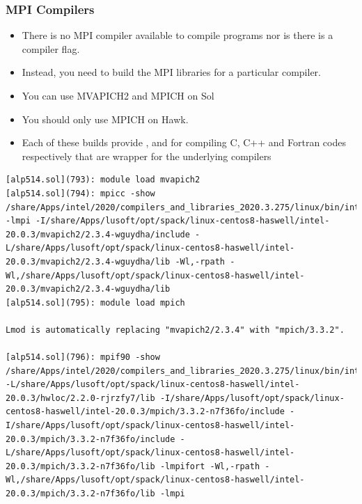 \documentclass[9pt,c]{beamer}
\begin{document}
\begin{frame}[fragile]
  \frametitle{MPI Compilers}
  \begin{itemize}
    \item There is no MPI compiler available to compile programs nor is there is a compiler flag.
    \item Instead, you need to build the MPI libraries for a particular compiler.
    \item You can use MVAPICH2 and MPICH on Sol
    \item You should only use MPICH on Hawk. 
    \item Each of these builds provide ,  and  for compiling C, C++ and Fortran codes respectively that are wrapper for the underlying compilers
  \end{itemize}
  \vspace{-0.25cm}
  \begin{block}{}
    \begin{lstlisting}[basicstyle=\tiny\ttfamily]
[alp514.sol](793): module load mvapich2
[alp514.sol](794): mpicc -show
/share/Apps/intel/2020/compilers_and_libraries_2020.3.275/linux/bin/intel64/icc -lmpi -I/share/Apps/lusoft/opt/spack/linux-centos8-haswell/intel-20.0.3/mvapich2/2.3.4-wguydha/include -L/share/Apps/lusoft/opt/spack/linux-centos8-haswell/intel-20.0.3/mvapich2/2.3.4-wguydha/lib -Wl,-rpath -Wl,/share/Apps/lusoft/opt/spack/linux-centos8-haswell/intel-20.0.3/mvapich2/2.3.4-wguydha/lib
[alp514.sol](795): module load mpich

Lmod is automatically replacing "mvapich2/2.3.4" with "mpich/3.3.2".

[alp514.sol](796): mpif90 -show
/share/Apps/intel/2020/compilers_and_libraries_2020.3.275/linux/bin/intel64/ifort -L/share/Apps/lusoft/opt/spack/linux-centos8-haswell/intel-20.0.3/hwloc/2.2.0-rjrzfy7/lib -I/share/Apps/lusoft/opt/spack/linux-centos8-haswell/intel-20.0.3/mpich/3.3.2-n7f36fo/include -I/share/Apps/lusoft/opt/spack/linux-centos8-haswell/intel-20.0.3/mpich/3.3.2-n7f36fo/include -L/share/Apps/lusoft/opt/spack/linux-centos8-haswell/intel-20.0.3/mpich/3.3.2-n7f36fo/lib -lmpifort -Wl,-rpath -Wl,/share/Apps/lusoft/opt/spack/linux-centos8-haswell/intel-20.0.3/mpich/3.3.2-n7f36fo/lib -lmpi
    \end{lstlisting}
  \end{block}
\end{frame}
\end{document}
